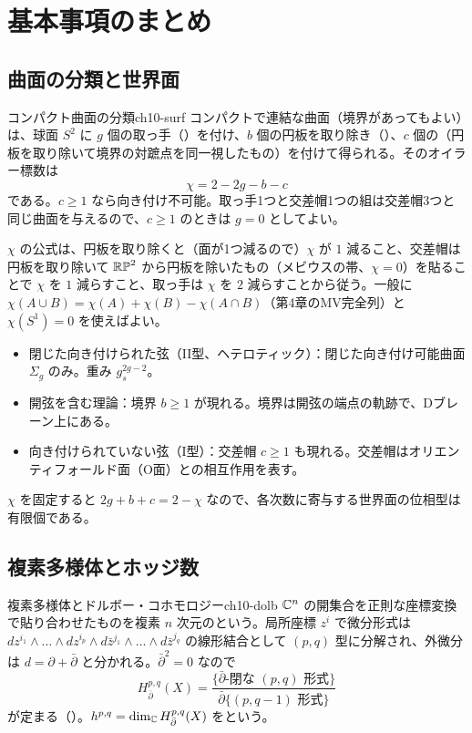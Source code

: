 \section{基本事項のまとめ}

\subsection{曲面の分類と世界面}

\begin{mythm}{コンパクト曲面の分類}{ch10-surf}
コンパクトで連結な曲面（境界があってもよい）は、球面 $S^2$ に $g$ 個の取っ手（）を付け、$b$ 個の円板を取り除き（）、$c$ 個の（円板を取り除いて境界の対蹠点を同一視したもの）を付けて得られる。そのオイラー標数は
\[
\chi=2-2g-b-c
\]
である。$c\ge1$ なら向き付け不可能。取っ手1つと交差帽1つの組は交差帽3つと同じ曲面を与えるので、$c\ge1$ のときは $g=0$ としてよい。
\end{mythm}
\begin{note}
$\chi$ の公式は、円板を取り除くと（面が1つ減るので）$\chi$ が $1$ 減ること、交差帽は円板を取り除いて $\mathbb{RP}^2$ から円板を除いたもの（メビウスの帯、$\chi=0$）を貼ることで $\chi$ を $1$ 減らすこと、取っ手は $\chi$ を $2$ 減らすことから従う。一般に $\chi(A\cup B)=\chi(A)+\chi(B)-\chi(A\cap B)$（第4章のMV完全列）と $\chi(S^1)=0$ を使えばよい。
\end{note}

\begin{physbox}[：弦の種類と世界面]
\begin{itemize}
\item 閉じた向き付けられた弦（II型、ヘテロティック）：閉じた向き付け可能曲面 $\Sigma_g$ のみ。重み $g_s^{2g-2}$。
\item 開弦を含む理論：境界 $b\ge1$ が現れる。境界は開弦の端点の軌跡で、Dブレーン上にある。
\item 向き付けられていない弦（I型）：交差帽 $c\ge1$ も現れる。交差帽はオリエンティフォールド面（O面）との相互作用を表す。
\end{itemize}
$\chi$ を固定すると $2g+b+c=2-\chi$ なので、各次数に寄与する世界面の位相型は有限個である。
\end{physbox}

\subsection{複素多様体とホッジ数}

\begin{mydef}{複素多様体とドルボー・コホモロジー}{ch10-dolb}
$\mathbb{C}^n$ の開集合を正則な座標変換で貼り合わせたものを複素 $n$ 次元のという。局所座標 $z^i$ で微分形式は $dz^{i_1}\wedge\dots\wedge dz^{i_p}\wedge d\bar z^{j_1}\wedge\dots\wedge d\bar z^{j_q}$ の線形結合として $(p,q)$ 型に分解され、外微分は $d=\partial+\bar\partial$ と分かれる。$\bar\partial^2=0$ なので
\[
H^{p,q}_{\bar\partial}(X)=\frac{\{\bar\partial\text{-閉な }(p,q)\text{ 形式}\}}{\bar\partial\{(p,q-1)\text{ 形式}\}}
\]
が定まる（）。$h^{p,q}=\dim_{\mathbb{C}} H^{p,q}_{\bar\partial}(X)$ をという。
\end{mydef}

